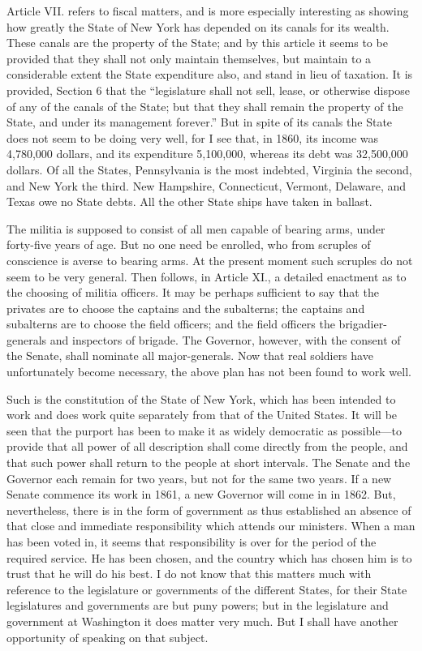 Article VII. refers to fiscal matters, and is more especially
interesting as showing how greatly the State of New York has
depended on its canals for its wealth.  These canals are the
property of the State; and by this article it seems to be provided
that they shall not only maintain themselves, but maintain to a
considerable extent the State expenditure also, and stand in lieu
of taxation.  It is provided, Section 6 that the ``legislature shall
not sell, lease, or otherwise dispose of any of the canals of the
State; but that they shall remain the property of the State, and
under its management forever.''  But in spite of its canals the
State does not seem to be doing very well, for I see that, in 1860,
its income was 4,780,000 dollars, and its expenditure 5,100,000,
whereas its debt was 32,500,000 dollars.  Of all the States,
Pennsylvania is the most indebted, Virginia the second, and New
York the third.  New Hampshire, Connecticut, Vermont, Delaware, and
Texas owe no State debts.  All the other State ships have taken in
ballast.

The militia is supposed to consist of all men capable of bearing
arms, under forty-five years of age.  But no one need be enrolled,
who from scruples of conscience is averse to bearing arms.  At the
present moment such scruples do not seem to be very general.  Then
follows, in Article XI., a detailed enactment as to the choosing of
militia officers.  It may be perhaps sufficient to say that the
privates are to choose the captains and the subalterns; the
captains and subalterns are to choose the field officers; and the
field officers the brigadier-generals and inspectors of brigade.
The Governor, however, with the consent of the Senate, shall
nominate all major-generals.  Now that real soldiers have
unfortunately become necessary, the above plan has not been found
to work well.

Such is the constitution of the State of New York, which has been
intended to work and does work quite separately from that of the
United States.  It will be seen that the purport has been to make
it as widely democratic as possible---to provide that all power of
all description shall come directly from the people, and that such
power shall return to the people at short intervals.  The Senate
and the Governor each remain for two years, but not for the same
two years.  If a new Senate commence its work in 1861, a new
Governor will come in in 1862.  But, nevertheless, there is in the
form of government as thus established an absence of that close and
immediate responsibility which attends our ministers.  When a man
has been voted in, it seems that responsibility is over for the
period of the required service.  He has been chosen, and the
country which has chosen him is to trust that he will do his best.
I do not know that this matters much with reference to the
legislature or governments of the different States, for their State
legislatures and governments are but puny powers; but in the
legislature and government at Washington it does matter very much.
But I shall have another opportunity of speaking on that subject.

